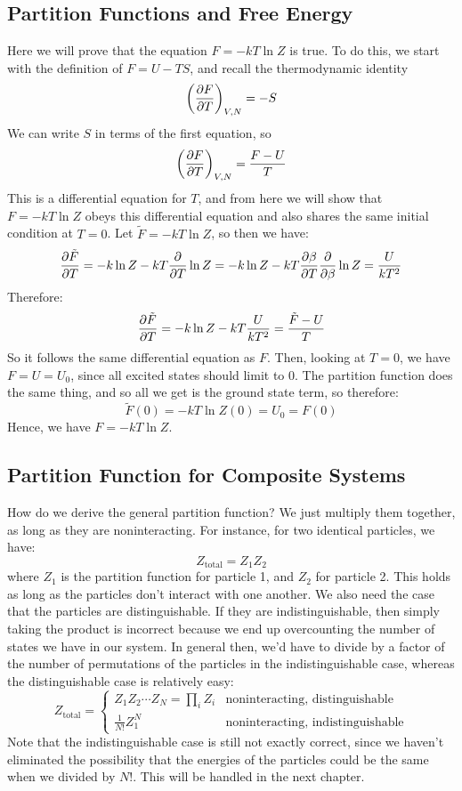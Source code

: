 \documentclass[10pt]{article}
\begin{document}
	\subsection{Partition Functions and Free Energy}
	Here we will prove that the equation \( F = -kT \ln Z \) is true. To do this, we start with the definition of \( F = U - TS\), 
	and recall the thermodynamic identity
	\[
		\left( \pdv{F}{T} \right)_{V, N} = -S
	\] 
	We can write \( S  \) in terms of the first equation, so
	\[
		\left( \pdv{F}{T} \right)_{V, N} = \frac{F - U}{T}
	\] 
	This is a differential equation for \( T \), and from here we will show that \( F = -kT \ln Z \) obeys this differential 
	equation and also shares the same initial condition at \( T = 0 \). Let \( \tilde F = -kT \ln Z	\), so then we have:
	\[
		\pdv{\tilde F}{T} = -k \ln Z - kT \pdv{T} \ln Z = -k \ln Z - kT \pdv{\beta}{T} \pdv{\beta} \ln Z = \frac{U}{kT^2}
	\] 
	Therefore:
	\[
		\pdv{\tilde F}{T} = -k \ln Z - kT \frac{U}{kT^2} = \frac{\tilde F - U}{T}
	\] 
	So it follows the same differential equation as \( F \). Then, looking at \( T = 0 \), we have \( F = U = U_0\), since all 
	excited states should limit to 0. The partition function does the same thing, and so all we get is the ground state 
	term, so therefore:
	\[
	\tilde F(0) = -kT \ln Z(0) = U_0 = F(0)
	\] 
	Hence, we have \( F = -kT \ln Z \). 

	\subsection{Partition Function for Composite Systems}
	How do we derive the general partition function? We just multiply them together, as long as they are 
	noninteracting. For instance, for two identical particles, we have:
	\[
	Z_{\text{total}} = Z_1Z_2
	\] 
	where \( Z_1 \) is the partition function for particle 1, and \( Z_2 \) for particle 2. This holds as long as 
	the particles don't interact with one another. We also need the case that the particles are distinguishable. If they are 
	indistinguishable, then simply taking the product is incorrect because we end up overcounting the number of states we have 
	in our system. In general then, we'd have to divide by a factor of the number of permutations of the particles in the 
	indistinguishable case, whereas the distinguishable case is relatively easy:
	\[
		Z_{\text{total}} = \begin{cases}
			Z_1Z_2 \cdots Z_N = \prod_i Z_i & \text{noninteracting, distinguishable}\\
			\frac{1}{N!} Z_1^{N} & \text{noninteracting, indistinguishable}
		\end{cases}
	\] 
	Note that the indistinguishable case is still not exactly correct, since we haven't eliminated the possibility that the 
	energies of the particles could be the same when we divided by \( N! \). This will be handled in the next
	chapter. 
\end{document}

